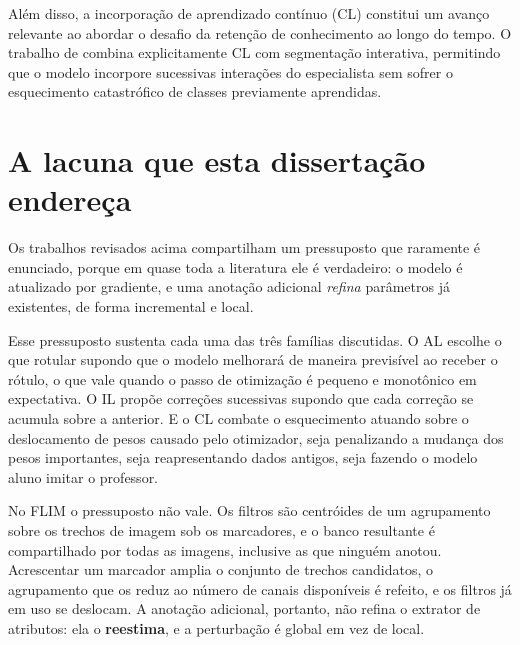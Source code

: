 Além disso, a incorporação de aprendizado contínuo (\ac{CL}) constitui um avanço relevante ao abordar o desafio da retenção de conhecimento ao longo do tempo. O trabalho de \cite{zheng2021continual} combina explicitamente \ac{CL} com segmentação interativa, permitindo que o modelo incorpore sucessivas interações do especialista sem sofrer o esquecimento catastrófico de classes previamente aprendidas.


\section{A lacuna que esta dissertação endereça}
\label{sec_lacuna}

Os trabalhos revisados acima compartilham um pressuposto que raramente é enunciado, porque em quase toda a literatura ele é verdadeiro: o modelo é atualizado por gradiente, e uma anotação adicional \emph{refina} parâmetros já existentes, de forma incremental e local.

Esse pressuposto sustenta cada uma das três famílias discutidas. O \ac{AL} escolhe o que rotular supondo que o modelo melhorará de maneira previsível ao receber o rótulo, o que vale quando o passo de otimização é pequeno e monotônico em expectativa. O \ac{IL} propõe correções sucessivas supondo que cada correção se acumula sobre a anterior. E o \ac{CL} combate o esquecimento atuando sobre o deslocamento de pesos causado pelo otimizador, seja penalizando a mudança dos pesos importantes, seja reapresentando dados antigos, seja fazendo o modelo aluno imitar o professor.

No \ac{FLIM} o pressuposto não vale. Os filtros são centróides de um agrupamento sobre os trechos de imagem sob os marcadores, e o banco resultante é compartilhado por todas as imagens, inclusive as que ninguém anotou. Acrescentar um marcador amplia o conjunto de trechos candidatos, o agrupamento que os reduz ao número de canais disponíveis é refeito, e os filtros já em uso se deslocam. A anotação adicional, portanto, não refina o extrator de atributos: ela o \textbf{reestima}, e a perturbação é global em vez de local.

